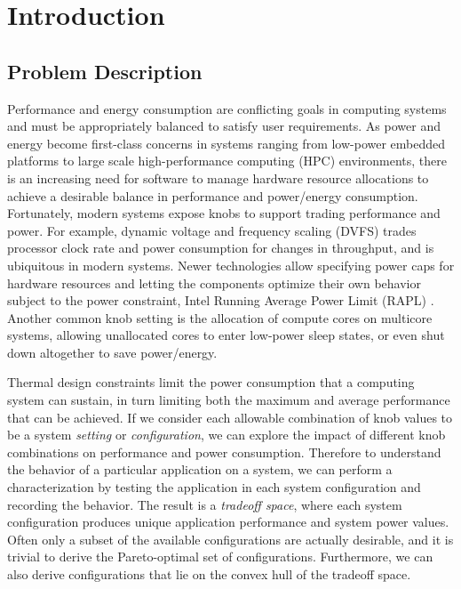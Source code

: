 \chapter{Introduction}

\section{Problem Description}

Performance and energy consumption are conflicting goals in computing systems and must be appropriately balanced to satisfy user requirements.
As power and energy become first-class concerns in systems ranging from low-power embedded platforms to large scale high-performance computing (HPC) environments, there is an increasing need for software to manage hardware resource allocations to achieve a desirable balance in performance and power/energy consumption.
Fortunately, modern systems expose knobs to support trading performance and power.
For example, dynamic voltage and frequency scaling (DVFS) trades processor clock rate and power consumption for changes in throughput, and is ubiquitous in modern systems.
Newer technologies allow specifying power caps for hardware resources and letting the components optimize their own behavior subject to the power constraint, \eg Intel Running Average Power Limit (RAPL) \cite{RAPL}.
Another common knob setting is the allocation of compute cores on multicore systems, allowing unallocated cores to enter low-power sleep states, or even shut down altogether to save power/energy.

Thermal design constraints limit the power consumption that a computing system can sustain, in turn limiting both the maximum and average performance that can be achieved.
If we consider each allowable combination of knob values to be a system \emph{setting} or \emph{configuration}, we can explore the impact of different knob combinations on performance and power consumption.
Therefore to understand the behavior of a particular application on a system, we can perform a characterization by testing the application in each system configuration and recording the behavior.
The result is a \emph{tradeoff space}, where each system configuration produces unique application performance and system power values.
Often only a subset of the available configurations are actually desirable, and it is trivial to derive the Pareto-optimal set of configurations.
Furthermore, we can also derive configurations that lie on the convex hull of the tradeoff space.

